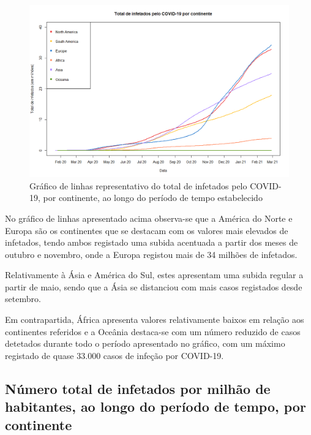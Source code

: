 \documentclass[conference]{IEEEtran}
\begin{document}
\begin{figure}[htbp]
\centerline{\includegraphics[width=0.95\columnwidth]{images/01.a.png}}
\caption{Gráfico de linhas representativo do total de infetados pelo COVID-19, por continente, ao longo do período de tempo estabelecido}
\label{fig}
\end{figure}

No gráfico de linhas apresentado acima observa-se que a América do Norte e Europa são os continentes que se destacam com os valores mais elevados de infetados, tendo ambos registado uma subida acentuada a partir dos meses de outubro e novembro, onde a Europa registou mais de 34 milhões de infetados. 

Relativamente à Ásia e América do Sul, estes apresentam uma subida regular a partir de maio, sendo que a Ásia se distanciou com mais casos registados desde setembro.

Em contrapartida, África apresenta valores relativamente baixos em relação aos continentes referidos e a Oceânia destaca-se com um número reduzido de casos detetados durante todo o período apresentado no gráfico, com um máximo registado de quase 33.000 casos de infeção por COVID-19.


\subsection{Número total de infetados por milhão de habitantes, ao longo do período de tempo, por continente}
\end{document}
